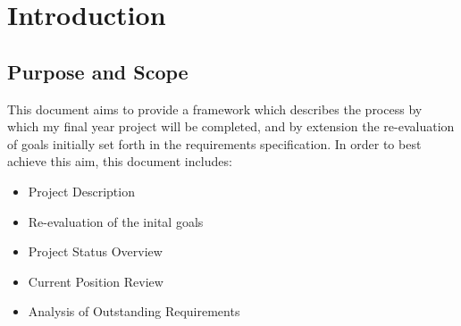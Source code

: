 
\section{Introduction} %



\subsection{Purpose and Scope} %

This document aims to provide a framework which describes the process by which my final year project will be completed, and by extension the re-evaluation of goals initially set forth in the requirements specification. In order to best achieve this aim, this document includes:

\begin{itemize}
\item Project Description
\item Re-evaluation of the inital goals
\item Project Status Overview
\item Current Position Review 
\item Analysis of Outstanding Requirements
\end{itemize}

